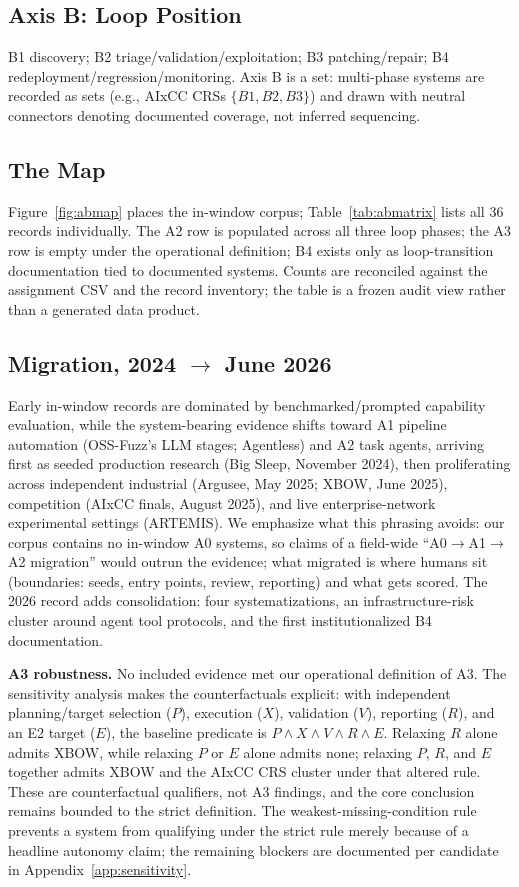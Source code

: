 \documentclass[conference,compsoc]{IEEEtran}
\begin{document}
\subsection{Axis B: Loop Position}
B1 discovery; B2 triage/validation/exploitation; B3 patching/repair; B4
redeployment/regression/monitoring. Axis B is a set: multi-phase systems are recorded as sets
(e.g., AIxCC CRSs $\{B1,B2,B3\}$) and drawn with neutral connectors denoting documented
coverage, not inferred sequencing.

\subsection{The Map}
Figure~\ref{fig:abmap} places the in-window corpus; Table~\ref{tab:abmatrix} lists all 36
records individually. The A2 row is populated across all three loop phases; the A3 row is
empty under the operational definition; B4 exists only as loop-transition documentation tied to
 documented systems. Counts are reconciled against the assignment CSV and the record inventory;
 the table is a frozen audit view rather than a generated data product.



\subsection{Migration, 2024 $\rightarrow$ June 2026}
Early in-window records are dominated by benchmarked/prompted capability evaluation, while the
system-bearing evidence shifts toward A1 pipeline automation (OSS-Fuzz's LLM stages; Agentless)
and A2 task agents, arriving first as seeded production research (Big Sleep, November 2024),
then proliferating across independent industrial (Argusee, May 2025; XBOW, June 2025),
competition (AIxCC finals, August 2025), and live enterprise-network experimental settings (ARTEMIS).
We emphasize what this phrasing avoids: our corpus contains no in-window A0 systems, so claims
of a field-wide ``A0$\rightarrow$A1$\rightarrow$A2 migration'' would outrun the evidence; what
migrated is where humans sit (boundaries: seeds, entry points, review, reporting) and what gets
scored. The 2026 record adds consolidation: four systematizations, an infrastructure-risk
cluster around agent tool protocols, and the first institutionalized B4 documentation.

\textbf{A3 robustness.} No included evidence met our operational definition of A3. The sensitivity analysis makes the counterfactuals explicit: with independent
planning/target selection ($P$), execution ($X$), validation ($V$), reporting ($R$), and an E2
target ($E$), the baseline predicate is $P\land X\land V\land R\land E$. Relaxing $R$ alone
admits XBOW, while relaxing $P$ or $E$ alone admits none; relaxing $P$, $R$, and $E$ together
admits XBOW and the AIxCC CRS cluster under that altered rule. These are counterfactual
qualifiers, not A3 findings, and the core conclusion remains bounded to the strict definition.
The weakest-missing-condition rule prevents a system from qualifying under the strict rule merely
because of a headline autonomy claim; the remaining blockers are documented per candidate in
Appendix~\ref{app:sensitivity}.
\end{document}
